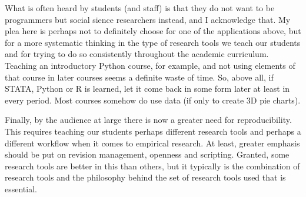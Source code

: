 \documentclass[fleqn,10pt]{SelfArx} %
\begin{document}
What is often heard by students (and staff) is that they do not want to be programmers but social sience researchers instead, and I acknowledge that. My plea here is perhaps not to definitely choose for one of the applications above, but for a more systematic thinking in the type of research tools we teach our students and for trying to do so consistently throughout the academic curriculum. Teaching an introductory Python course, for example, and not using elements of that course in later courses seems a definite waste of time. So, above all, if STATA, Python or R is learned, let it come back in some form later at least in every period. Most courses somehow do use data (if only to create 3D pie charts).

Finally, by the audience at large there is now a greater need for reproducibility. This requires teaching our students perhaps different research tools and perhaps a different workflow when it comes to empirical research. At least, greater emphasis should be put on revision management, openness and scripting. Granted, some research tools are better in this than others, but it typically is the combination of research tools and the philosophy behind the set of research tools used that is essential.


\printbibliography

\end{document}
